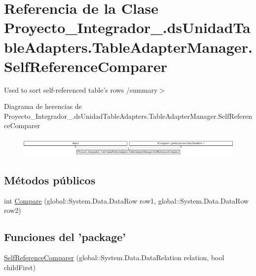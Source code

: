 \hypertarget{class_proyecto___integrador__3_1_1ds_unidad_table_adapters_1_1_table_adapter_manager_1_1_self_reference_comparer}{\section{Referencia de la Clase Proyecto\-\_\-\-Integrador\-\_.\-ds\-Unidad\-Table\-Adapters.\-Table\-Adapter\-Manager.\-Self\-Reference\-Comparer}
\label{class_proyecto___integrador__3_1_1ds_unidad_table_adapters_1_1_table_adapter_manager_1_1_self_reference_comparer}
}


Used to sort self-\/referenced table's rows /summary$>$  


Diagrama de herencias de Proyecto\-\_\-\-Integrador\-\_.\-ds\-Unidad\-Table\-Adapters.\-Table\-Adapter\-Manager.\-Self\-Reference\-Comparer\begin{figure}[H]
\begin{center}
\leavevmode
\includegraphics[height=1.000000cm]{de/deb/class_proyecto___integrador__3_1_1ds_unidad_table_adapters_1_1_table_adapter_manager_1_1_self_reference_comparer}
\end{center}
\end{figure}
\subsection*{Métodos públicos}
\begin{DoxyCompactItemize}
\item 
int \hyperlink{class_proyecto___integrador__3_1_1ds_unidad_table_adapters_1_1_table_adapter_manager_1_1_self_reference_comparer_ac9d7f18f49ab41e15559caf23c836a67}{Compare} (global\-::\-System.\-Data.\-Data\-Row row1, global\-::\-System.\-Data.\-Data\-Row row2)
\end{DoxyCompactItemize}
\subsection*{Funciones del 'package'}
\begin{DoxyCompactItemize}
\item 
\hyperlink{class_proyecto___integrador__3_1_1ds_unidad_table_adapters_1_1_table_adapter_manager_1_1_self_reference_comparer_a7e477770e6d76147fa1fcdfea080ce2c}{Self\-Reference\-Comparer} (global\-::\-System.\-Data.\-Data\-Relation relation, bool child\-First)
\end{DoxyCompactItemize}
